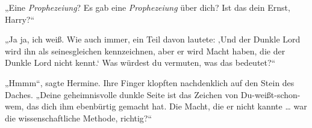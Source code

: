 „Eine \emph{Prophezeiung}? Es gab eine \emph{Prophezeiung} über dich? Ist das dein Ernst, Harry?“

„Ja ja, ich weiß. Wie auch immer, ein Teil davon lautete: ‚Und der Dunkle Lord wird ihn als seinesgleichen kennzeichnen, aber er wird Macht haben, die der Dunkle Lord nicht kennt.‘ Was würdest du vermuten, was das bedeutet?“

„Hmmm“, sagte Hermine. Ihre Finger klopften nachdenklich auf den Stein des Daches.
„Deine geheimnisvolle dunkle Seite ist das Zeichen von Du-weißt-schon-wem, das dich ihm ebenbürtig gemacht hat. Die Macht, die er nicht kannte … war die wissenschaftliche Methode, richtig?“

